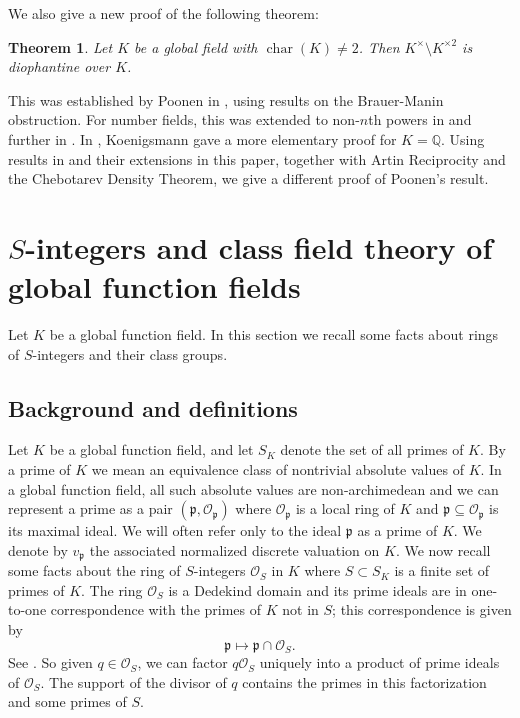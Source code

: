 \documentclass[12pt,reqno]{amsart}
\newcommand{\OO}{\mathcal{O}}
\newcommand{\QQ}{\mathbb{Q}}
\newcommand{\pp}{\mathfrak{p}}
\DeclareMathOperator{\ch}{char}
\newtheorem{thm}{Theorem}[section]
\theoremstyle{definition}
\begin{document}
We
also give a new proof of the following theorem:
\begin{thm}\label{nonsq}
Let $K$ be a global field with $\ch(K)\not=2$. Then $K^{\times}\setminus K^{\times2}$ is diophantine over  $K$. 
\end{thm}
This was established by Poonen in \cite{Poo09b}, using results on the
Brauer-Manin obstruction. For number fields, this was extended to
non-$n$th powers in \cite{CTG15} and further in
\cite{Dit16}.  In \cite{Koe13}, Koenigsmann gave a more
elementary proof for $K=\QQ$.
 Using
results in \cite{Park} and their extensions in this paper, together
with Artin Reciprocity and the Chebotarev Density Theorem, we
give a different proof of Poonen's result.







\section{$S$-integers and class field theory of global function fields}\label{ffcft}

Let $K$ be a global function field. In this section we recall some
facts about rings of $S$-integers and their class groups. 

\subsection{Background and definitions}
Let $K$ be a global function field, and let $S_K$ denote the set of
all primes of $K$. By a prime of $K$ we mean an equivalence class of
nontrivial absolute values of $K$. In a global function field, all
such absolute values are non-archimedean and we can represent a prime
as a pair $(\pp,\OO_{\pp})$ where $\OO_{\pp}$ is a local ring of $K$
and $\pp\subseteq\OO_{\pp}$ is its maximal ideal. We will often refer
only to the ideal $\pp$ as a prime of $K$.  We denote by $v_{\pp}$ 
the associated normalized discrete valuation on $K$. We now recall some
facts about the ring of $S$-integers $\OO_S$ in $K$ where $S\subset
S_K$ is a finite set of primes of $K$. The ring $\OO_S$ is a Dedekind
domain and its prime ideals are in one-to-one correspondence with the
primes of $K$ not in $S$; this correspondence is given by
\[
\pp\mapsto \pp\cap\OO_S.
\]
See \cite[Theorem 14.5]{Rosen02}. So given $q\in \OO_S$, we can factor
$q\OO_S$ uniquely into a product of prime ideals of $\OO_S$. The
support of the divisor of $q$ contains the primes in this
factorization and some primes of $S$.
\end{document}
